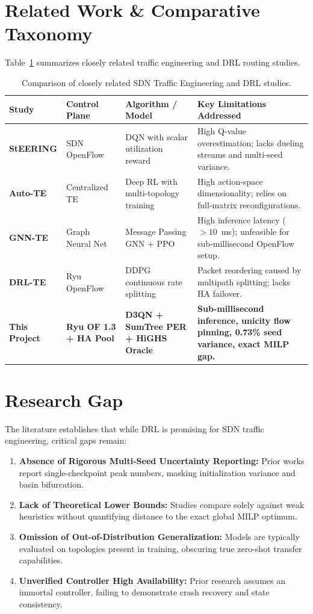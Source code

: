 \documentclass[12pt,a4paper,oneside]{report}
\begin{document}
\section{Related Work \& Comparative Taxonomy}
Table~\ref{tab:related_work_comparison} summarizes closely related traffic engineering and DRL routing studies.

\begin{table}[htbp]
\centering
\small
\caption{Comparison of closely related SDN Traffic Engineering and DRL studies.}
\label{tab:related_work_comparison}
\begin{tabularx}{\textwidth}{>{\bfseries}p{22mm}>{\raggedright\arraybackslash}p{28mm}>{\raggedright\arraybackslash}p{38mm}>{\raggedright\arraybackslash}X}
\toprule
Study & Control Plane & Algorithm / Model & Key Limitations Addressed \\
\midrule
StEERING \cite{khatfoor2020reinforcement} & SDN OpenFlow & DQN with scalar utilization reward & High Q-value overestimation; lacks dueling streams and multi-seed variance. \\
Auto-TE \cite{almasan2022deep} & Centralized TE & Deep RL with multi-topology training & High action-space dimensionality; relies on full-matrix reconfigurations. \\
GNN-TE \cite{badia2023towards} & Graph Neural Net & Message Passing GNN + PPO & High inference latency ($>10$~ms); unfeasible for sub-millisecond OpenFlow setup. \\
DRL-TE \cite{chen2021drl} & Ryu OpenFlow & DDPG continuous rate splitting & Packet reordering caused by multipath splitting; lacks HA failover. \\
\textbf{This Project} & \textbf{Ryu OF 1.3 + HA Pool} & \textbf{D3QN + SumTree PER + HiGHS Oracle} & \textbf{Sub-millisecond inference, unicity flow pinning, 0.73\% seed variance, exact MILP gap.} \\
\bottomrule
\end{tabularx}
\end{table}

\section{Research Gap}
The literature establishes that while DRL is promising for SDN traffic engineering, critical gaps remain:
\begin{enumerate}
  \item \textbf{Absence of Rigorous Multi-Seed Uncertainty Reporting:} Prior works report single-checkpoint peak numbers, masking initialization variance and basin bifurcation.
  \item \textbf{Lack of Theoretical Lower Bounds:} Studies compare solely against weak heuristics without quantifying distance to the exact global MILP optimum.
  \item \textbf{Omission of Out-of-Distribution Generalization:} Models are typically evaluated on topologies present in training, obscuring true zero-shot transfer capabilities.
  \item \textbf{Unverified Controller High Availability:} Prior research assumes an immortal controller, failing to demonstrate crash recovery and state consistency.
\end{enumerate}
\end{document}
